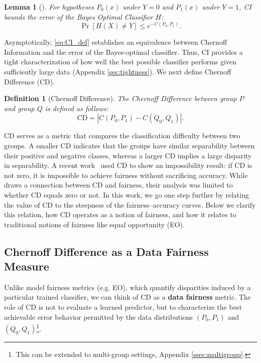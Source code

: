 \documentclass[11pt,letterpaper]{article}
\newtheorem{lemma}{Lemma}
\newtheorem{definition}{Definition}
\begin{document}
\begin{lemma}[\citep{nielsen2011}] \label{lem:bound}
    For hypotheses $P_0(x)$ under $Y=0$ and $P_1(x)$ under $Y=1$, CI bounds the error of the Bayes Optimal Classifier $H$:
    \begin{equation} \label{eq:CI_def}
        \Pr[H(X) \neq Y] \leq e^{-C(P_0, P_1)}.    
    \end{equation}
    
\end{lemma}
Asymptotically, \eqref{eq:CI_def} establishes an equivalence between Chernoff Information and the error of the Bayes-optimal classifier. Thus, CI provides a tight characterization of how well the best possible classifier performs given sufficiently large data (Appendix \ref{sec:tightness}). We next define Chernoff Difference (CD).

\begin{definition}
    [Chernoff Difference] The Chernoff Difference between group $P$ and group $Q$ is defined as follows:
    \begin{equation} \text{CD} = \left|C(P_0, P_1) - C(Q_0, Q_1)\right|.\end{equation}
\end{definition}
CD serves as a metric that compares the classification difficulty between two groups. A smaller CD indicates that the groups have similar separability between their positive and negative classes, whereas a larger CD implies a large disparity in separability. A recent work~\citep{dutta2020there} used CD to show an impossibility result: if CD is not zero, it is impossible to achieve fairness without sacrificing accuracy. While \citet{dutta2020there} draws a connection between CD and fairness, their analysis was limited to whether CD equals zero or not. In this work, we go one step further by relating the value of CD to the steepness of the fairness–accuracy curves. Below we clarify this relation, how CD operates as a notion of fairness, and how it relates to traditional notions of fairness like equal opportunity (EO).
\subsection{Chernoff Difference as a Data Fairness Measure}

Unlike model fairness metrics (e.g. EO), which quantify disparities induced by a particular trained classifier, we can think of CD as a  \textbf{data fairness} metric. The role of CD is not to evaluate a learned predictor, but to characterize the best achievable error behavior permitted by the data distributions $(P_0,P_1)$ and $(Q_0,Q_1)$\footnote{This can be extended to multi-group settings, Appendix \ref{ssec:multigroup}.}. 
\end{document}
